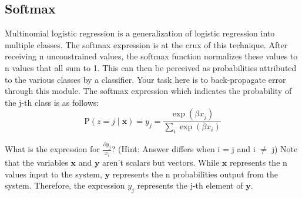 \documentclass[11pt]{article}
\newcommand{\0}{\mat{0}}
\newcommand{\vect}[1]{\bm{#1}}     %
\begin{document}
\subsection{Softmax}
Multinomial logistic regression is a generalization of logistic regression into multiple classes. The softmax expression is at the crux of this technique. After receiving n unconstrained values, the softmax function normalizes these values to n values that all sum to 1. This can then be perceived as probabilities attributed to the various classes by a classifier. Your task here is to back-propagate error through this module. The softmax expression which indicates the probability of the j-th class is as follows:
\[
	\mathrm {P}(z = j \; | \; \vect{x} ) = y_j = \frac{\exp(\beta x_j)}{\sum_i \exp(\beta x_i)}
\]

What is the expression for  $\frac{\partial y_j}{x_i}$? (Hint: Answer differs when i = j and i $\ne$ j)
Note that the variables $\vect{x}$ and $\vect{y}$ aren’t scalars but vectors. 
While $\vect{x}$ represents the n values input to the system,  $\vect{y}$ represents the n probabilities output from the system. Therefore, the expression $y_j$ represents the j-th element of $\vect{y}$.
\end{document}
